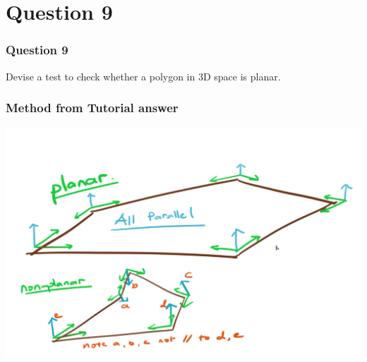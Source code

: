 \documentclass{beamer}
\begin{document}
\section{Question 9}

\begin{frame}
    \frametitle{Question 9}
    Devise a test to check whether a polygon in 3D space is planar.
\end{frame}

\begin{frame}
    \frametitle{Method from Tutorial answer}

    \begin{center}
        \includegraphics[scale=0.3]{planar.png}
    \end{center}
    
\end{frame}
\end{document}
